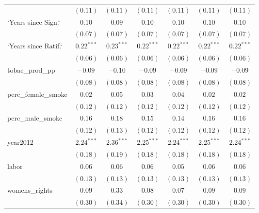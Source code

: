 \begin{table}[!h]
\begin{center}
\begin{tabular}{l c c c c c c }
                        & $(0.11)$     & $(0.11)$     & $(0.11)$     & $(0.11)$     & $(0.11)$     & $(0.11)$     \\
`Years since Sign.`     & $0.10$       & $0.09$       & $0.10$       & $0.10$       & $0.10$       & $0.10$       \\
                        & $(0.07)$     & $(0.07)$     & $(0.07)$     & $(0.07)$     & $(0.07)$     & $(0.07)$     \\
`Years since Ratif.`    & $0.22^{***}$ & $0.23^{***}$ & $0.22^{***}$ & $0.22^{***}$ & $0.22^{***}$ & $0.22^{***}$ \\
                        & $(0.06)$     & $(0.06)$     & $(0.06)$     & $(0.06)$     & $(0.06)$     & $(0.06)$     \\
tobac\_prod\_pp         & $-0.09$      & $-0.10$      & $-0.09$      & $-0.09$      & $-0.09$      & $-0.09$      \\
                        & $(0.08)$     & $(0.08)$     & $(0.08)$     & $(0.08)$     & $(0.08)$     & $(0.08)$     \\
perc\_female\_smoke     & $0.02$       & $0.05$       & $0.03$       & $0.04$       & $0.02$       & $0.02$       \\
                        & $(0.12)$     & $(0.12)$     & $(0.12)$     & $(0.12)$     & $(0.12)$     & $(0.12)$     \\
perc\_male\_smoke       & $0.16$       & $0.18$       & $0.15$       & $0.14$       & $0.16$       & $0.16$       \\
                        & $(0.12)$     & $(0.13)$     & $(0.12)$     & $(0.12)$     & $(0.12)$     & $(0.12)$     \\
year2012                & $2.24^{***}$ & $2.36^{***}$ & $2.25^{***}$ & $2.24^{***}$ & $2.25^{***}$ & $2.24^{***}$ \\
                        & $(0.18)$     & $(0.19)$     & $(0.18)$     & $(0.18)$     & $(0.18)$     & $(0.18)$     \\
labor                   & $0.06$       & $0.06$       & $0.06$       & $0.05$       & $0.06$       & $0.06$       \\
                        & $(0.13)$     & $(0.13)$     & $(0.13)$     & $(0.13)$     & $(0.13)$     & $(0.13)$     \\
womens\_rights          & $0.09$       & $0.33$       & $0.08$       & $0.07$       & $0.09$       & $0.09$       \\
                        & $(0.30)$     & $(0.34)$     & $(0.30)$     & $(0.30)$     & $(0.30)$     & $(0.30)$     \\

\end{tabular}
\end{center}
\end{table}
